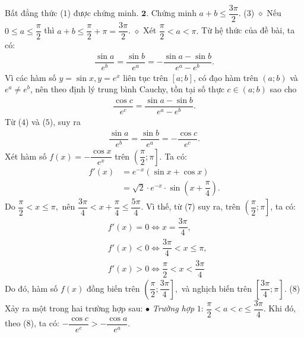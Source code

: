 \begin{multicols}{2}
	\vskip 0.05cm 
	Bất đẳng thức ($1$) được chứng minh.
	\vskip 0.05cm
	$\pmb{2.}$ Chứng minh $a + b \le \dfrac{{3\pi }}{2}.$ \hfill ($3$)
	\vskip 0.05cm
	$\diamond$ Nếu  $0 \le a \le \dfrac{\pi }{2}$ thì $a + b \le \dfrac{\pi }{2} + \pi  = \dfrac{{3\pi }}{2}$.
	\vskip 0.05cm   
	$\diamond$ Xét $\dfrac{\pi }{2} < a < \pi .$
	\vskip 0.05cm 
	Từ hệ thức của đề bài, ta có:
	\begin{align*}
		\dfrac{{\sin a}}{{{e^b}}} = \dfrac{{\sin b}}{{{e^a}}} =  - \dfrac{{\sin a - \sin b}}{{{e^a} - {e^b}}}. \tag{$4$}
	\end{align*}
	Vì các hàm số  $y = \sin x, y = e^x$ liên tục trên  $[a;b]$, có đạo hàm trên $(a;b)$  và $e^a \ne e^b$,  nên theo định lý trung bình Cauchy, tồn tại số thực $c \in (a;b)$  sao cho
	\begin{align*}
		\dfrac{{\cos c}}{{{e^c}}} = \dfrac{{\sin a - \sin b}}{{{e^a} - {e^b}}}. \tag{$5$}
	\end{align*}
	Từ ($4$) và ($5$), suy ra
	\begin{align*}
		\dfrac{{\sin a}}{{{e^b}}} = \dfrac{{\sin b}}{{{e^a}}} =  - \dfrac{{\cos c}}{{{e^c}}}. \tag{$6$}
	\end{align*}
	Xét hàm số $f\left( x \right) =  - \dfrac{{\cos x}}{{{e^x}}}$  trên  $\left( {\dfrac{\pi }{2};\pi } \right]$. Ta có:
	\begin{align*}
		f'\left( x \right) &= {e^{ - x}}\left( {\sin x + \cos x} \right) \\[-0.6ex]
		&= \sqrt 2  \cdot {e^{ - x}} \cdot \sin \left( {x + \dfrac{\pi }{4}} \right). \tag{$7$}
	\end{align*}
	Do $\dfrac{\pi }{2} < x \le \pi ,$ nên  $\dfrac{{3\pi }}{4} < x + \dfrac{\pi }{4} \le \dfrac{{5\pi }}{4}$. Vì thế, từ ($7$) suy ra, trên $\left( {\dfrac{\pi }{2};\pi } \right]$,  ta có:
	\begin{align*}
		&f'(x) = 0   \Leftrightarrow x = \dfrac{3\pi}{4},\\[-0.7ex]
		&f'(x) < 0 \Leftrightarrow \dfrac{3\pi}{4} < x \le \pi,\\[-0.7ex]
		&f'(x) > 0 \Leftrightarrow \dfrac{\pi}{2} < x < \dfrac{3\pi}{4}
	\end{align*}
	Do đó, hàm số  $f(x)$ đồng biến trên $\left( {\dfrac{\pi }{2};\dfrac{{3\pi }}{4}} \right]\!\!,$  và nghịch biến trên  $\left[ {\dfrac{{3\pi }}{4};\pi } \right]\!\!.$ \hfill ($8$)
	\vskip 0.01cm
	Xảy ra một trong hai trường hợp sau:
	\vskip 0.01cm
	$\bullet$ \textit{Trường hợp} $1$:  $\dfrac{\pi }{2} < a < c \le \dfrac{{3\pi }}{4}.$
	\vskip 0.01cm
	Khi đó, theo ($8$), ta có:
		$- \dfrac{{\cos c}}{{{e^c}}} >  - \dfrac{{\cos a}}{{{e^a}}}$.

\end{multicols}
